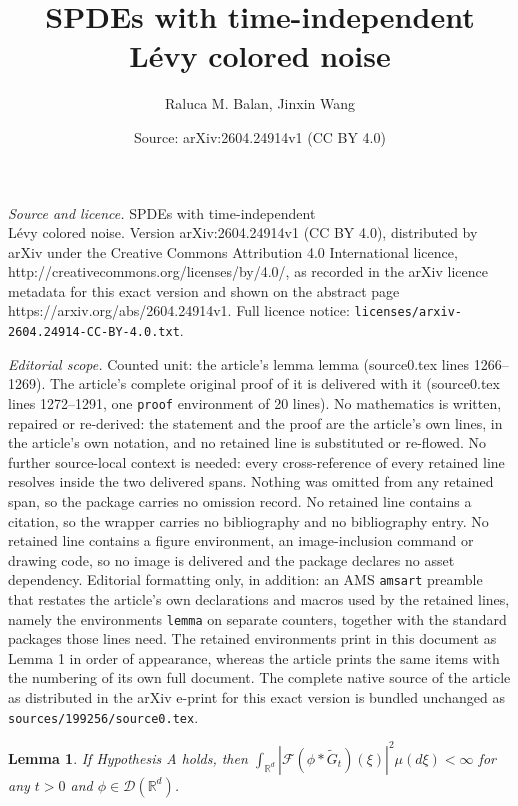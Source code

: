 \documentclass[10pt,a4paper]{amsart}
\title{SPDEs with time-independent\\ L\'evy colored noise}
\author{Raluca M. Balan, Jinxin Wang}
\date{Source: arXiv:2604.24914v1 (CC BY 4.0)}
\newtheorem{lemma}{Lemma}
\def\bR{\mathbb{R}}
\def\cD{\mathcal{D}}
\def\cF{\mathcal{F}}
\begin{document}
\maketitle

\noindent\emph{Source and licence.} SPDEs with time-independent\\ L\'evy colored noise. Version arXiv:2604.24914v1 (CC BY 4.0), distributed by arXiv under the Creative Commons Attribution 4.0 International licence, http://creativecommons.org/licenses/by/4.0/, as recorded in the arXiv licence metadata for this exact version and shown on the abstract page https://arxiv.org/abs/2604.24914v1. Full licence notice: \texttt{licenses/arxiv-2604.24914-CC-BY-4.0.txt}.\par\smallskip

\noindent\textit{Editorial scope.} Counted unit: the article's lemma lemma (source0.tex lines 1266--1269). The article's complete original proof of it is delivered with it (source0.tex lines 1272--1291, one \texttt{proof} environment of 20 lines). No mathematics is written, repaired or re-derived: the statement and the proof are the article's own lines, in the article's own notation, and no retained line is substituted or re-flowed.  No further source-local context is needed: every cross-reference of every retained line resolves inside the two delivered spans.  Nothing was omitted from any retained span, so the package carries no omission record.  No retained line contains a citation, so the wrapper carries no bibliography and no bibliography entry.  No retained line contains a figure environment, an image-inclusion command or drawing code, so no image is delivered and the package declares no asset dependency.  Editorial formatting only, in addition: an AMS \texttt{amsart} preamble that restates the article's own declarations and macros used by the retained lines, namely the environments \texttt{lemma} on separate counters, together with the standard packages those lines need.  The retained environments print in this document as Lemma 1 in order of appearance, whereas the article prints the same items with the numbering of its own full document.  The complete native source of the article as distributed in the arXiv e-print for this exact version is bundled unchanged as \texttt{sources/199256/source0.tex}.
\begin{lemma}
If Hypothesis A holds, then $\int_{\bR^d}|\cF(\phi* \widetilde{G}_{t})(\xi)|^2 \mu(d\xi)
<\infty$ for any $t>0$ and $\phi \in \cD(\bR^d)$.
\end{lemma}
\end{document}

